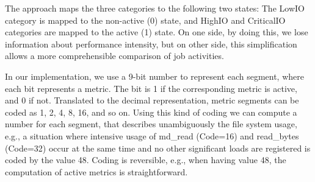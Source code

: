 \documentclass[]{llncs}
\begin{document}
The approach maps the three categories to the following two states: The LowIO category is mapped to the non-active (0) state, and HighIO and CriticalIO categories are mapped to the active (1) state.
On one side, by doing this, we lose information about performance intensity, but on other side, this simplification allows a more comprehensible comparison of job activities.

In our implementation, we use a 9-bit number to represent each segment, where each bit represents a metric.
The bit is 1 if the corresponding metric is active, and 0 if not.
Translated to the decimal representation, metric segments can be coded as 1, 2, 4, 8, 16, and so on.
Using this kind of coding we can compute a number for each segment, that describes unambiguously the file system usage, e.g., a situation where intensive usage of md\_read (Code=16) and read\_bytes (Code=32) occur at the same time and no other significant loads are registered is coded by the value 48.
Coding is reversible, e.g., when having value 48, the computation of active metrics is straightforward.

\end{document}
